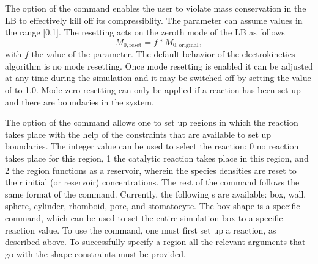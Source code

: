 \begin{essyntax}
  \begin{features}
  \end{features}
\end{essyntax}
The  option of the  command 
enables the user to violate mass conservation in the LB to effectively kill off
its compressiblity. The parameter  can assume values in the range
[0,1]. The resetting acts on the zeroth mode of the LB as follows
\begin{equation}
\label{eq:ek-mode} M_{0,\mathrm{reset}} = f * M_{0,\mathrm{original}} ,
\end{equation}
with $f$ the value of the  parameter. The default behavior of the
electrokinetics algorithm is no mode resetting. Once mode resetting is enabled
it can be adjusted at any time during the simulation and it may be switched off
by setting the value of  to 1.0. Mode zero resetting can only be
applied if a reaction has been set up and there are boundaries in the system.

\begin{essyntax}
  \begin{features}
  \end{features}
\end{essyntax}
The  option of the  command allows one 
to set up regions in which the reaction takes place with the help of the 
constraints that are available to set up boundaries. The integer value 
 can be used to select the reaction: 0 no reaction takes
place for this region, 1 the catalytic reaction takes place in this region, and 
2 the region functions as a reservoir, wherein the species densities are reset
to their initial (or reservoir) concentrations. The rest of the command follows 
the same format of the  command. Currently, the 
following s are available: box, wall, sphere, cylinder, rhomboid, 
pore, and stomatocyte. The box shape is a  specific command, which
can be used to set the entire simulation box to a specific reaction value. To
use the  command, one must first set up
a reaction, as described above. To successfully specify a region all the 
relevant arguments that go with the shape constraints must be provided.

